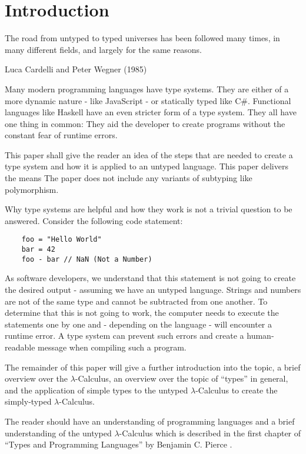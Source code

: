 \section{Introduction}
\label{sec:intro}

\epigraph{
    The road from untyped to typed universes has been followed many times,
    in many different fields, and largely for the same reasons.
}
{Luca Cardelli and Peter Wegner (1985)}

Many modern programming languages have type systems.
They are either of a more dynamic nature - like JavaScript -
or statically typed like C\#. Functional languages like Haskell have
an even stricter form of a type system. They all have one thing in
common: They aid the developer to create programs without
the constant fear of runtime errors.

This paper shall give the reader an idea of the steps that
are needed to create a type system and how it is applied to
an untyped language. This paper delivers the means
The paper does not include any variants of subtyping like polymorphism.

Why type systems are helpful and how they work
is not a trivial question to be answered. Consider
the following code statement:

\begin{verbatim}
    foo = "Hello World"
    bar = 42
    foo - bar // NaN (Not a Number)
\end{verbatim}

As software developers, we understand that this statement
is not going to create the desired output - assuming we have an untyped
language. Strings and numbers are not
of the same type and cannot be subtracted from one another. To determine
that this is not going to work, the computer needs to execute
the statements one by one and - depending on the language - will encounter
a runtime error. A type system can prevent such errors and create a
human-readable message when compiling such a program.

The remainder of this paper will give a further introduction into the topic,
a brief overview over the $\lambda$-Calculus, an overview
over the topic of ``types'' in general, and the application
of simple types to the untyped $\lambda$-Calculus to create the
simply-typed $\lambda$-Calculus.

The reader should have an understanding of programming
languages and a brief understanding of the untyped
$\lambda$-Calculus which is described in the first
chapter of ``Types and Programming Languages'' by
Benjamin C. Pierce \cite{pierce2002ProgLang}.
